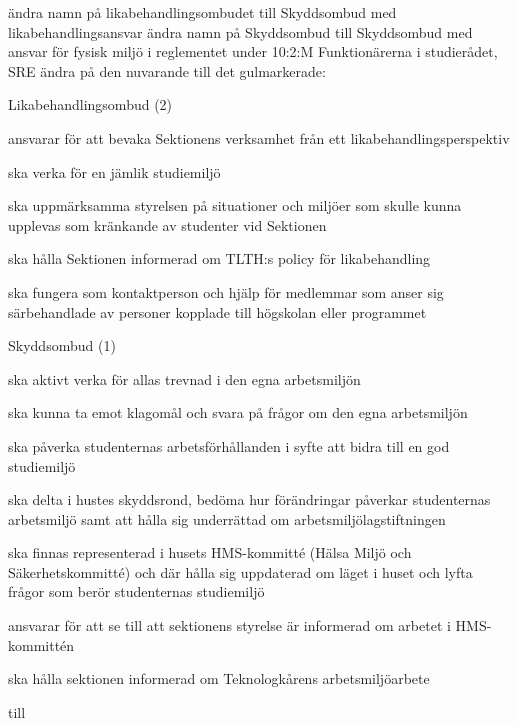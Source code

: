 \documentclass[../_main/handlingar.tex]{subfiles}
\begin{document}
\begin{attsatser}
  \att ändra namn på likabehandlingsombudet till Skyddsombud med
  likabehandlingsansvar
  \att ändra namn på Skyddsombud till Skyddsombud med ansvar för fysisk miljö
  \att i reglementet under 10:2:M Funktionärerna i studierådet, SRE ändra på den
  nuvarande till det gulmarkerade:

  Likabehandlingsombud (2)
  \begin{dashlist}
      \item ansvarar för att bevaka Sektionens verksamhet från ett likabehandlingsperspektiv
      \item ska verka för en jämlik studiemiljö
      \item ska uppmärksamma styrelsen på situationer och miljöer som skulle kunna upplevas som kränkande av studenter vid Sektionen
      \item ska hålla Sektionen informerad om TLTH:s policy för likabehandling
      \item ska fungera som kontaktperson och hjälp för medlemmar som anser sig särbehandlade av personer kopplade till högskolan eller programmet
  \end{dashlist}
  Skyddsombud (1)
      \begin{dashlist}
          \item ska aktivt verka för allas trevnad i den egna arbetsmiljön
          \item ska kunna ta emot klagomål och svara på frågor om den egna arbetsmiljön
          \item ska påverka studenternas arbetsförhållanden i syfte att bidra till en god studiemiljö
          \item ska delta i hustes skyddsrond, bedöma hur förändringar påverkar studenternas arbetsmiljö samt att
hålla sig underrättad om arbetsmiljölagstiftningen
    \item ska finnas representerad i husets HMS-kommitté (Hälsa Miljö och Säkerhetskommitté) och där hålla
sig uppdaterad om läget i huset och lyfta frågor som berör studenternas studiemiljö
    \item ansvarar för att se till att sektionens styrelse är informerad om arbetet i HMS-kommittén
    \item ska hålla sektionen informerad om Teknologkårens arbetsmiljöarbete
      \end{dashlist}

      till


\end{attsatser}
\end{document}
